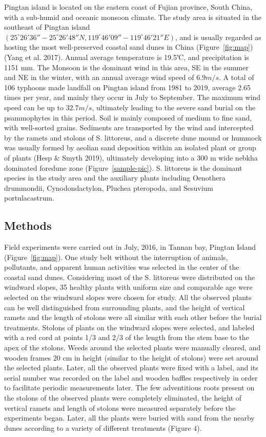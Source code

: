 \documentclass[]{interact}
\theoremstyle{plain}%
\theoremstyle{definition}
\theoremstyle{remark}
\begin{document}
Pingtan island is located on the eastern coast of Fujian province, South China, with a sub-humid and oceanic monsoon climate. The study area is situated in the southeast of Pingtan island $(25^{\circ}26'36''-25^{\circ}26'48''N, 119^{\circ}46'09''-119^{\circ}46'21''E)$, and is usually regarded as hosting the most well-preserved coastal sand dunes in China (Figure~\ref{fig:map}) (Yang et al. 2017). Annual average temperature is 19.5℃, and precipitation is 1151 mm. The Monsoon is the dominant wind in this area, SE in the summer and NE in the winter, with an annual average wind speed of $6.9 m/s$. A total of 106 typhoons made landfall on Pingtan island from 1981 to 2019, average 2.65 times per year, and mainly they occur in July to September. The maximum wind speed can be up to $32.7 m/s$, ultimately leading to the severe sand burial on the psammophytes in this period. Soil is mainly composed of medium to fine sand, with well-sorted grains. Sediments are transported by the wind and intercepted by the ramets and stolons of S. littoreus, and a discrete dune mound or hummock was usually formed by aeolian sand deposition within an isolated plant or group of plants (Hesp \& Smyth 2019), ultimately developing into a 300 m wide nebkha dominated foredune zone (Figure~\ref{sample-pic}). S. littoreus is the dominant species in the study area and the auxiliary plants including Oenothera drummondii, Cynodondactylon, Pluchea pteropoda, and Sesuvium portulacastrum. 



\subsection{Methods}
Field experiments were carried out in July, 2016, in Tannan bay, Pingtan Island (Figure~\ref{fig:map}). One study belt without the interruption of animals, pollutants, and apparent human activities was selected in the center of the coastal sand dunes. Considering most of the S. littoreus were distributed on the windward slopes, 35 healthy plants with uniform size and comparable age were selected on the windward slopes were chosen for study. All the observed plants can be well distinguished from surrounding plants, and the height of vertical ramets and the length of stolons were all similar with each other before the burial treatments. Stolons of plants on the windward slopes were selected, and labeled with a red cord at points 1/3 and 2/3 of the length from the stem base to the apex of the stolons. Weeds around the selected plants were manually cleared, and wooden frames 20 cm in height (similar to the height of stolons) were set around the selected plants. Later, all the observed plants were fixed with a label, and its serial number was recorded on the label and wooden baffles respectively in order to facilitate periodic measurements later. The few adventitious roots present on the stolons of the observed plants were completely eliminated, the height of vertical ramets and length of stolons were measured separately before the experiments began. Later, all the plants were buried with sand from the nearby dunes according to a variety of different treatments (Figure 4). 
\end{document}
